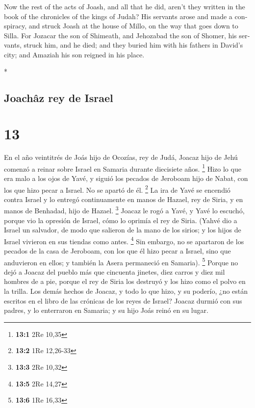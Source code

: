 \begin{paracol}{2}
\begin{otherlanguage}{english}
 Now the rest of the acts of Joash, and all that he did,
aren't they written in the book of the chronicles of the kings of Judah?
 His servants arose and made a conspiracy, and struck
Joash at the house of Millo, on the way that goes down to Silla.
 For Jozacar the son of Shimeath, and Jehozabad the son
of Shomer, his servants, struck him, and he died; and they buried him
with his fathers in David's city; and Amaziah his son reigned in his
place.

\end{otherlanguage}

\switchcolumn[0]*

\hypertarget{joachuxe2z-rey-de-israel}{%
\subsection{Joachâz rey de Israel}\label{joachuxe2z-rey-de-israel}}

\hypertarget{section-24}{%
\section{13}\label{section-24}}

 En el año veintitrés de Joás hijo de Ocozías, rey de
Judá, Joacaz hijo de Jehú comenzó a reinar sobre Israel en Samaria
durante diecisiete años. \footnote{\textbf{13:1} 2Re 10,35}
 Hizo lo que era malo a los ojos de Yavé, y siguió los
pecados de Jeroboam hijo de Nabat, con los que hizo pecar a Israel. No
se apartó de él. \footnote{\textbf{13:2} 1Re 12,26-33}  La
ira de Yavé se encendió contra Israel y lo entregó continuamente en
manos de Hazael, rey de Siria, y en manos de Benhadad, hijo de Hazael.
\footnote{\textbf{13:3} 2Re 10,32}  Joacaz le rogó a Yavé,
y Yavé lo escuchó, porque vio la opresión de Israel, cómo lo oprimía el
rey de Siria.  (Yahvé dio a Israel un salvador, de modo
que salieron de la mano de los sirios; y los hijos de Israel vivieron en
sus tiendas como antes. \footnote{\textbf{13:5} 2Re 14,27}
 Sin embargo, no se apartaron de los pecados de la casa de
Jeroboam, con los que él hizo pecar a Israel, sino que anduvieron en
ellos; y también la Asera permaneció en Samaria). \footnote{\textbf{13:6}
  1Re 16,33}  Porque no dejó a Joacaz del pueblo más que
cincuenta jinetes, diez carros y diez mil hombres de a pie, porque el
rey de Siria los destruyó y los hizo como el polvo en la trilla.
 Los demás hechos de Joacaz, y todo lo que hizo, y su
poderío, ¿no están escritos en el libro de las crónicas de los reyes de
Israel?  Joacaz durmió con sus padres, y lo enterraron en
Samaria; y su hijo Joás reinó en su lugar.


\end{paracol}

